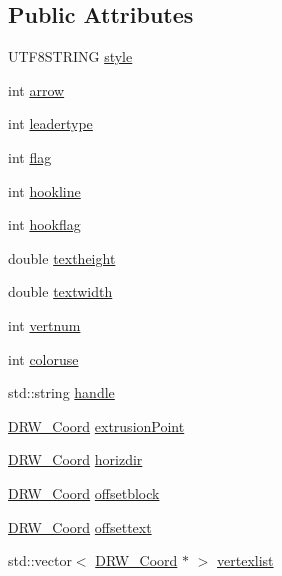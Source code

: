 \subsection*{Public Attributes}
\begin{DoxyCompactItemize}
\item 
U\+T\+F8\+S\+T\+R\+I\+N\+G \hyperlink{class_d_r_w___leader_a7a4e898ceae92208a03e86f7857e78e0}{style}
\item 
int \hyperlink{class_d_r_w___leader_a42f61a808411cf8465ec7f64c49cc4a6}{arrow}
\item 
int \hyperlink{class_d_r_w___leader_a4ba900b63165cb87b79612a9f9b4ff50}{leadertype}
\item 
int \hyperlink{class_d_r_w___leader_adcf19e8f9d127c910267e37a9d09e828}{flag}
\item 
int \hyperlink{class_d_r_w___leader_a80aca0277cc06cbcb4af9c6a42decf06}{hookline}
\item 
int \hyperlink{class_d_r_w___leader_a5d47804340900202fe3d1cd7bebbcecf}{hookflag}
\item 
double \hyperlink{class_d_r_w___leader_a5d4c5d32e962710240fc6ffa392c951b}{textheight}
\item 
double \hyperlink{class_d_r_w___leader_ab08450146f7f0658eca773a534d64be0}{textwidth}
\item 
int \hyperlink{class_d_r_w___leader_a8c0f8d7ebce1a2f1a4cb6d367a0c6a0d}{vertnum}
\item 
int \hyperlink{class_d_r_w___leader_afdff2ddfa67b8f2f46b367f52e06e027}{coloruse}
\item 
std\+::string \hyperlink{class_d_r_w___leader_a59ce8c8abeb1764ce3dbf042758d7cfa}{handle}
\item 
\hyperlink{class_d_r_w___coord}{D\+R\+W\+\_\+\+Coord} \hyperlink{class_d_r_w___leader_a9ef3ab714584747ac54612c47edd570a}{extrusion\+Point}
\item 
\hyperlink{class_d_r_w___coord}{D\+R\+W\+\_\+\+Coord} \hyperlink{class_d_r_w___leader_a31292925946b20b3c24f679c54f83523}{horizdir}
\item 
\hyperlink{class_d_r_w___coord}{D\+R\+W\+\_\+\+Coord} \hyperlink{class_d_r_w___leader_aa6a2e2b354365f405b52240c9bca3c8a}{offsetblock}
\item 
\hyperlink{class_d_r_w___coord}{D\+R\+W\+\_\+\+Coord} \hyperlink{class_d_r_w___leader_a6326c764bc74feaf7a5a3efa57325f67}{offsettext}
\item 
std\+::vector$<$ \hyperlink{class_d_r_w___coord}{D\+R\+W\+\_\+\+Coord} $\ast$ $>$ \hyperlink{class_d_r_w___leader_a7aef5bd8c0202b0c6836e15552866fcd}{vertexlist}
\end{DoxyCompactItemize}
